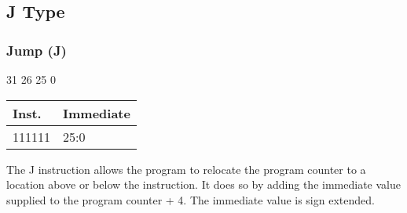 \documentclass[12pt]{article}
\begin{document}


\newpage
\subsection{J Type}

\subsubsection{Jump (J)}
    
    \hspace{2cm}31 \hspace{1.24cm}26 \hspace{.05cm}25 \hspace{9.3cm}0
    \vspace{-.25cm}
    \begin{center}
        \begin{tabular}{ |p{1.8cm}|p{9.8cm}| }
            \hline
            \textbf{Inst.} & \textbf{Immediate}\\
            \hline
            111111& 25:0\\
            \hline
        \end{tabular}
    \end{center}
    
    \noindent
    The J instruction allows the program to relocate the program counter to a location above or below the instruction. It does so by adding the immediate value supplied to the program counter + 4. The immediate value is sign extended.
    
\end{document}
